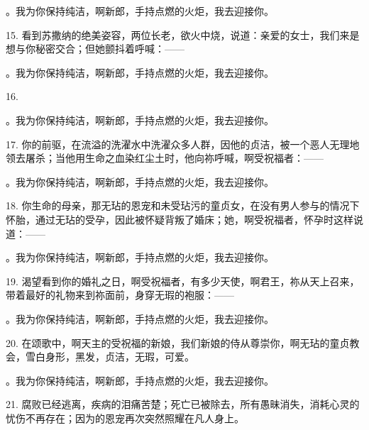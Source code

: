  。我为你保持纯洁，啊新郎，手持点燃的火炬，我去迎接你。\par

 15. 看到苏撒纳的绝美姿容，两位长老，欲火中烧，说道：亲爱的女士，我们来是想与你秘密交合；但她颤抖着呼喊：——\par

 。我为你保持纯洁，啊新郎，手持点燃的火炬，我去迎接你。\par

 16. \par

 。我为你保持纯洁，啊新郎，手持点燃的火炬，我去迎接你。\par

 17. 你的前驱，在流溢的洗濯水中洗濯众多人群，因他的贞洁，被一个恶人无理地领去屠杀；当他用生命之血染红尘土时，他向祢呼喊，啊受祝福者：——\par

 。我为你保持纯洁，啊新郎，手持点燃的火炬，我去迎接你。\par

 18. 你生命的母亲，那无玷的恩宠和未受玷污的童贞女，在没有男人参与的情况下怀胎，通过无玷的受孕，因此被怀疑背叛了婚床；她，啊受祝福者，怀孕时这样说道：——\par

 。我为你保持纯洁，啊新郎，手持点燃的火炬，我去迎接你。\par

 19. 渴望看到你的婚礼之日，啊受祝福者，有多少天使，啊君王，祢从天上召来，带着最好的礼物来到祢面前，身穿无瑕的袍服：——\par

 。我为你保持纯洁，啊新郎，手持点燃的火炬，我去迎接你。\par

 20. 在颂歌中，啊天主的受祝福的新娘，我们新娘的侍从尊崇你，啊无玷的童贞教会，雪白身形，黑发，贞洁，无瑕，可爱。\par

 。我为你保持纯洁，啊新郎，手持点燃的火炬，我去迎接你。\par

 21. 腐败已经逃离，疾病的泪痛苦楚；死亡已被除去，所有愚昧消失，消耗心灵的忧伤不再存在；因为的恩宠再次突然照耀在凡人身上。\par

